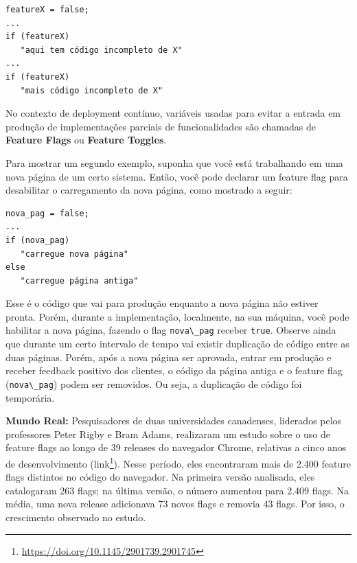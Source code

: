 \documentclass[
  11pt,
  twoside]{book}
\newcommand{\passthrough}[1]{#1}
\DeclareRobustCommand{\href}[2]{#2\footnote{\url{#1}}}
\newenvironment{esmbox}{\centering \vspace{1.5ex} \begin{tcolorbox}[breakable, colback=backcolor, width=4.9in]}{\end{tcolorbox} \vspace{1.5ex}}
\begin{document}
\begin{lstlisting}
featureX = false;
...
if (featureX) 
   "aqui tem código incompleto de X"
...
if (featureX)
   "mais código incompleto de X"
\end{lstlisting}

No contexto de deployment contínuo, variáveis usadas para evitar a
entrada em produção de implementações parciais de funcionalidades são
chamadas de \textbf{Feature Flags} ou \textbf{Feature Toggles}.

Para mostrar um segundo exemplo, suponha que você está trabalhando em
uma nova página de um certo sistema. Então, você pode declarar um
feature flag para desabilitar o carregamento da nova página, como
mostrado a seguir:

\begin{lstlisting}
nova_pag = false;
...
if (nova_pag) 
   "carregue nova página"
else
   "carregue página antiga"
\end{lstlisting}

Esse é o código que vai para produção enquanto a nova página não estiver
pronta. Porém, durante a implementação, localmente, na sua máquina, você
pode habilitar a nova página, fazendo o flag
\passthrough{\lstinline!nova\_pag!} receber
\passthrough{\lstinline!true!}. Observe ainda que durante um certo
intervalo de tempo vai existir duplicação de código entre as duas
páginas. Porém, após a nova página ser aprovada, entrar em produção e
receber feedback positivo dos clientes, o código da página antiga e o
feature flag (\passthrough{\lstinline!nova\_pag!}) podem ser removidos.
Ou seja, a duplicação de código foi temporária.


\begin{esmbox}

\textbf{Mundo Real:} Pesquisadores de duas universidades canadenses,
liderados pelos professores Peter Rigby e Bram Adams, realizaram um
estudo sobre o uso de feature flags ao longo de 39 releases do navegador
Chrome, relativas a cinco anos de desenvolvimento
(\href{https://doi.org/10.1145/2901739.2901745}{link}). Nesse período,
eles encontraram mais de 2.400 feature flags distintos no código do
navegador. Na primeira versão analisada, eles catalogaram 263 flags; na
última versão, o número aumentou para 2.409 flags. Na média, uma nova
release adicionava 73 novos flags e removia 43 flags. Por isso, o
crescimento observado no estudo.

\end{esmbox}
\end{document}
